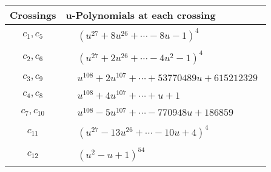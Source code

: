 \documentclass[1p]{elsarticle_modified}
\theoremstyle{definition}
\begin{document}
\begin{tabular}{m{50pt}|m{274pt}}
Crossings & \hspace{64pt}u-Polynomials at each crossing \\
\hline $$\begin{aligned}c_{1},c_{5}\end{aligned}$$&$\begin{aligned}
&(u^{27}+8 u^{26}+\cdots-8 u-1)^{4}
\end{aligned}$\\
\hline $$\begin{aligned}c_{2},c_{6}\end{aligned}$$&$\begin{aligned}
&(u^{27}+2 u^{26}+\cdots-4 u^2-1)^{4}
\end{aligned}$\\
\hline $$\begin{aligned}c_{3},c_{9}\end{aligned}$$&$\begin{aligned}
&u^{108}+2 u^{107}+\cdots+53770489 u+615212329
\end{aligned}$\\
\hline $$\begin{aligned}c_{4},c_{8}\end{aligned}$$&$\begin{aligned}
&u^{108}+4 u^{107}+\cdots+u+1
\end{aligned}$\\
\hline $$\begin{aligned}c_{7},c_{10}\end{aligned}$$&$\begin{aligned}
&u^{108}-5 u^{107}+\cdots-770948 u+186859
\end{aligned}$\\
\hline $$\begin{aligned}c_{11}\end{aligned}$$&$\begin{aligned}
&(u^{27}-13 u^{26}+\cdots-10 u+4)^{4}
\end{aligned}$\\
\hline $$\begin{aligned}c_{12}\end{aligned}$$&$\begin{aligned}
&(u^2- u+1)^{54}
\end{aligned}$\\
\hline
\end{tabular}\\~\\
\newpage\renewcommand{\arraystretch}{1}
\end{document}
